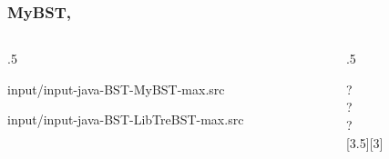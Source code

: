 \documentclass[10pt]{beamer}
\begin{document}
\begin{frame}[t]\frametitle{MyBST, }
	\vspace{-0.3cm}
	\begin{columns}[T] %
	\begin{column}{.5\linewidth} %
		{\tiny 
			
				{input/input-java-BST-MyBST-max.src}
		} %
		{\tiny 
			
				{input/input-java-BST-LibTreBST-max.src}
		} %
	\end{column} %
	\begin{column}{.5\linewidth} %
		{\tiny 
		\begin{example}
		\begin{center}
			
		\end{center}
		{\scriptsize 		
			 ?\\
			 ?\\				
			 ?\\				
		} %
		\end{example}
		} %
	\end{column} %
	\end{columns} %

\end{frame}
\end{document}
